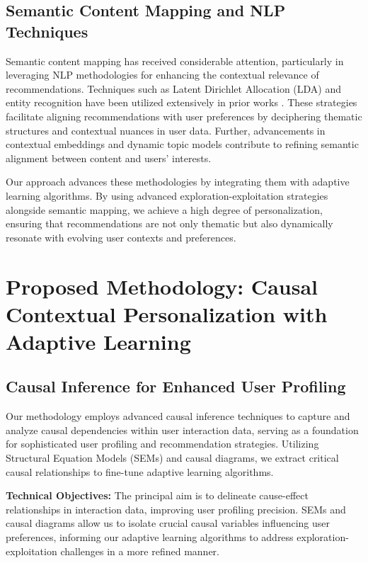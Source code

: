 \documentclass{article} %
\begin{document}
\subsection{Semantic Content Mapping and NLP Techniques}

Semantic content mapping has received considerable attention, particularly in leveraging NLP methodologies for enhancing the contextual relevance of recommendations. Techniques such as Latent Dirichlet Allocation (LDA) and entity recognition have been utilized extensively in prior works \citep{Blei2003LDA,Manning2014Stanford,Pennington2014GloVe,Devlin2019BERT}. These strategies facilitate aligning recommendations with user preferences by deciphering thematic structures and contextual nuances in user data. Further, advancements in contextual embeddings and dynamic topic models \citep{Liu2019Text,Pang2008Opinion} contribute to refining semantic alignment between content and users' interests.

Our approach advances these methodologies by integrating them with adaptive learning algorithms. By using advanced exploration-exploitation strategies alongside semantic mapping, we achieve a high degree of personalization, ensuring that recommendations are not only thematic but also dynamically resonate with evolving user contexts and preferences.


\section{Proposed Methodology: Causal Contextual Personalization with Adaptive Learning}

\subsection{Causal Inference for Enhanced User Profiling}

Our methodology employs advanced causal inference techniques to capture and analyze causal dependencies within user interaction data, serving as a foundation for sophisticated user profiling and recommendation strategies. Utilizing Structural Equation Models (SEMs) and causal diagrams, we extract critical causal relationships to fine-tune adaptive learning algorithms.

\textbf{Technical Objectives:} The principal aim is to delineate cause-effect relationships in interaction data, improving user profiling precision. SEMs and causal diagrams allow us to isolate crucial causal variables influencing user preferences, informing our adaptive learning algorithms to address exploration-exploitation challenges in a more refined manner.
\end{document}
